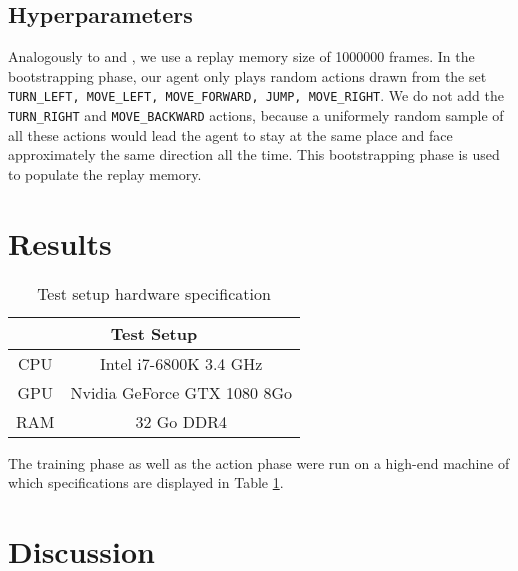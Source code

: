 \documentclass[letterpaper]{article}
\newcommand\Tstrut{\rule{0pt}{2.6ex}}
\begin{document}
\subsection{Hyperparameters}
Analogously to \cite{Mnih2015} and \cite{Lample2016}, we use a replay memory size of 1000000 frames. In the bootstrapping phase, our agent only plays random actions drawn from the set \texttt{TURN\_LEFT, MOVE\_LEFT, MOVE\_FORWARD, JUMP, MOVE\_RIGHT}. We do not add the \texttt{TURN\_RIGHT} and \texttt{MOVE\_BACKWARD} actions, because a uniformely random sample of all these actions would lead the agent to stay at the same place and face approximately the same direction all the time. This bootstrapping phase is used to populate the replay memory.


\section{Results}
\begin{table}[h]
\centering
\begin{tabular}{cc}
\multicolumn{2}{c}{Test Setup}                         \Tstrut\\ \hline 
\multicolumn{1}{c|}{CPU} & Intel i7-6800K 3.4 GHz      \Tstrut\\
\multicolumn{1}{c|}{GPU} & Nvidia GeForce GTX 1080 8Go \Tstrut\\
\multicolumn{1}{c|}{RAM} & 32 Go DDR4                      \Tstrut
\end{tabular}
\caption{Test setup hardware specification}
\label{tab:specs}
\end{table}

The training phase as well as the action phase were run on a high-end machine of which specifications are displayed in Table \ref{tab:specs}.

\section{Discussion}


\footnotesize


\end{document}
